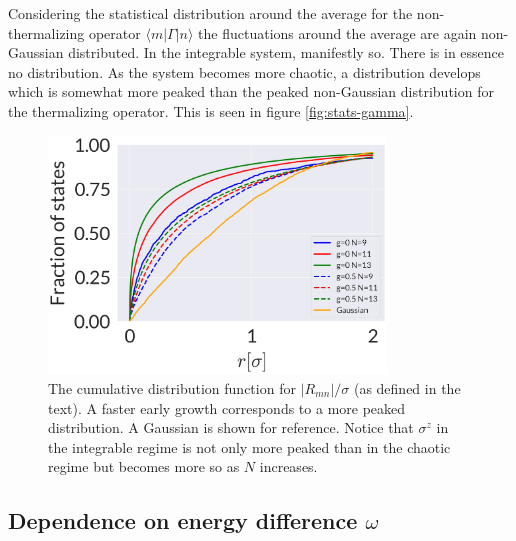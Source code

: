 Considering the statistical distribution around the average for the non-thermalizing operator $\langle m|\Gamma|n\rangle$ the fluctuations around the average are again non-Gaussian distributed. In the integrable system, manifestly so. There is in essence no distribution. As the system becomes more chaotic, a distribution develops which is somewhat more peaked than the peaked non-Gaussian distribution for the thermalizing operator. This is seen in figure \ref{fig:stats-gamma}.


\begin{figure}
	\centering
\includegraphics[width=0.8\textwidth]{figures/chapter1/quantileradial.png}
\caption{The cumulative distribution function for $|R_{mn}|/\sigma$ (as defined in the text). A faster early growth corresponds to a more peaked distribution. A Gaussian is shown for reference. Notice that $\sigma^z$ in the integrable regime is not only more peaked than in the chaotic regime but becomes more so as $N$ increases.}
\label{fig:quantiles}
\end{figure}

\subsection{Dependence on energy difference $\omega$}

